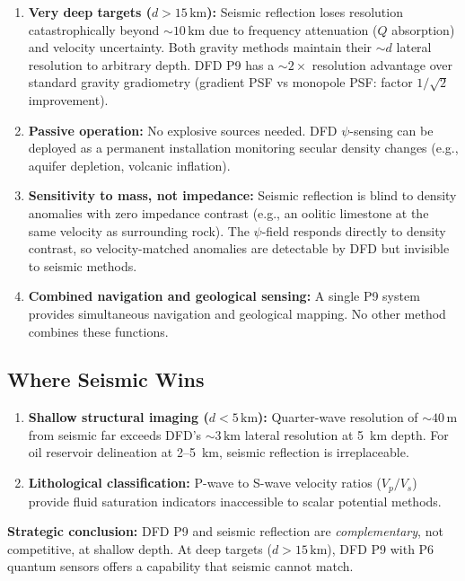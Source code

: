 \documentclass[aps,prd,twocolumn,superscriptaddress,nofootinbib]{revtex4-2}
\newcommand{\km}{\,\mathrm{km}}
\begin{document}
\begin{enumerate}
\item \textbf{Very deep targets ($d > 15\km$):} Seismic reflection
  loses resolution catastrophically beyond $\sim 10\km$ due to
  frequency attenuation ($Q$ absorption) and velocity uncertainty.
  Both gravity methods maintain their $\sim d$ lateral resolution
  to arbitrary depth.  DFD P9 has a $\sim 2\times$ resolution
  advantage over standard gravity gradiometry (gradient PSF
  vs monopole PSF: factor $1/\sqrt{2}$ improvement).

\item \textbf{Passive operation:} No explosive sources needed.
  DFD $\psi$-sensing can be deployed as a permanent installation
  monitoring secular density changes (e.g., aquifer depletion,
  volcanic inflation).

\item \textbf{Sensitivity to mass, not impedance:} Seismic reflection
  is blind to density anomalies with zero impedance contrast
  (e.g., an oolitic limestone at the same velocity as surrounding
  rock).  The $\psi$-field responds directly to density contrast,
  so velocity-matched anomalies are detectable by DFD but invisible
  to seismic methods.

\item \textbf{Combined navigation and geological sensing:}
  A single P9 system provides simultaneous navigation and geological
  mapping.  No other method combines these functions.
\end{enumerate}

\subsection{Where Seismic Wins}

\begin{enumerate}
\item \textbf{Shallow structural imaging ($d < 5\km$):} Quarter-wave
  resolution of $\sim 40\,\mathrm{m}$ from seismic far exceeds
  DFD's $\sim 3\km$ lateral resolution at 5~km depth.  For oil
  reservoir delineation at 2--5~km, seismic reflection is
  irreplaceable.

\item \textbf{Lithological classification:} P-wave to S-wave
  velocity ratios ($V_p/V_s$) provide fluid saturation indicators
  inaccessible to scalar potential methods.
\end{enumerate}

\textbf{Strategic conclusion:} DFD P9 and seismic reflection are
\emph{complementary}, not competitive, at shallow depth.  At deep
targets ($d > 15\km$), DFD P9 with P6 quantum sensors offers
a capability that seismic cannot match.
\end{document}
